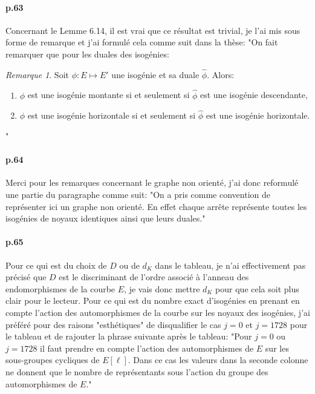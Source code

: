 \documentclass[10pt,a4paper]{article}
\theoremstyle{plain}
\theoremstyle{definition}
\theoremstyle{definition}
\theoremstyle{definition}
\theoremstyle{definition}
\theoremstyle{definition}
\theoremstyle{remark}
\newtheorem{rem}[thm]{Remarque}
\theoremstyle{remark}
\theoremstyle{definition}
\begin{document}
\paragraph{p.63}{Concernant le Lemme 6.14, il est vrai que ce résultat est trivial, je l'ai mis sous forme de remarque et j'ai formulé cela comme suit dans la thèse: 
"On fait remarquer que pour les duales des isogénies:
\begin{rem}
\label{lem:dua:vol}
Soit $\phi : E \mapsto E'$ une isogénie et sa duale $\widehat{\phi}$. Alors:
\begin{enumerate}
\item $\phi$ est une isogénie montante si et seulement si $\widehat{\phi}$ est une isogénie descendante,
\item $\phi$ est une isogénie horizontale si et seulement si $\widehat{\phi}$ est une isogénie horizontale.
\end{enumerate}
\end{rem}"}

\paragraph{p.64}{Merci pour les remarques concernant le graphe non orienté, 
j'ai donc reformulé une partie du paragraphe comme suit: "On a pris comme 
convention de représenter ici un graphe non orienté. En effet chaque arrête 
représente toutes les isogénies de noyaux identiques ainsi que leurs duales."}

\paragraph{p.65}{Pour ce qui est du choix de $D$ ou de $d_{K}$ dans le tableau,
je n'ai effectivement pas précisé que $D$ est le discriminant de l'ordre 
associé à l'anneau des endomorphismes de la courbe $E$, je vais donc mettre 
$d_K$ pour que cela soit plus clair pour le lecteur. Pour ce qui est du nombre 
exact d'isogénies en prenant en compte l'action des automorphismes de la 
courbe sur les noyaux des isogénies, j'ai préféré pour des raisons 
"esthétiques" de disqualifier le cas $j=0$ et $j=1728$ pour le tableau et de 
rajouter la phrase suivante après le tableau: "Pour $j=0$ ou $j=1728$ il faut 
prendre en compte l'action des automorphismes de
$E$ sur les sous-groupes cycliques de $E[\ell]$. Dans ce cas
 les valeurs dans la seconde colonne ne donnent que le nombre 
de représentants sous l'action du groupe des automorphismes de $E$."}


\end{document}
